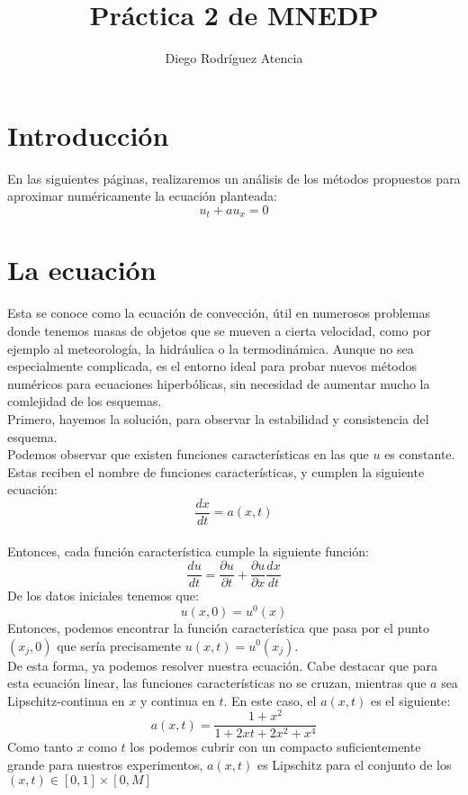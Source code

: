 \documentclass[10pt]{article}
\title{Práctica 2 de MNEDP}
\author{Diego Rodríguez Atencia}
\begin{document}
\maketitle
\section{Introducción}
En las siguientes páginas, realizaremos un análisis de los métodos propuestos para aproximar numéricamente la ecuación planteada:\\
\begin{equation}
    u_{t} + a u_{x} = 0
\end{equation}
\section{La ecuación}
Esta se conoce como la ecuación de convección, útil en numerosos problemas donde tenemos masas de objetos que se mueven a cierta velocidad, como por ejemplo al meteorología, la hidráulica o la termodinámica. Aunque no sea especialmente complicada, es el entorno ideal para probar nuevos métodos numéricos para ecuaciones hiperbólicas, sin necesidad de aumentar mucho la comlejidad de los esquemas.\\
Primero, hayemos la solución, para observar la estabilidad y consistencia del esquema.\\
Podemos observar que existen funciones características en las que $u$ es constante.
Estas reciben el nombre de funciones características, y cumplen la siguiente ecuación:\\
\begin{equation}
    \frac{dx}{dt} = a(x, t)
\end{equation}
\\Entonces, cada función característica cumple la siguiente función:\\
\begin{equation}
    \frac{du}{dt} = \frac{\partial u}{\partial t} + \frac{\partial u}{\partial x}
    \frac{dx}{dt}
\end{equation}
De los datos iniciales tenemos que:\\
\begin{equation}
    u(x, 0) = u^{0}(x)
\end{equation}
Entonces, podemos encontrar la función característica que pasa por el punto $(x_{j}, 0)$ que sería precisamente $u(x, t) = u^{0}(x_{j})$.\\De esta forma, ya podemos resolver nuestra ecuación. Cabe destacar que para esta ecuación linear, las funciones características no se cruzan, mientras que $a$ sea Lipschitz-continua en $x$ y continua en $t$. En este caso, el $a(x, t)$ es el siguiente:
\begin{equation}
	a(x, t) = \frac{1+x^{2}}{1+2xt+ 2x^{2}+x^{4}}
\end{equation}
Como tanto $x$ como $t$ los podemos cubrir con un compacto suficientemente grande para nuestros experimentos, $a(x, t)$ es Lipschitz para el conjunto de los $(x, t) \in [0, 1]\times[0,M]$
\end{document}
